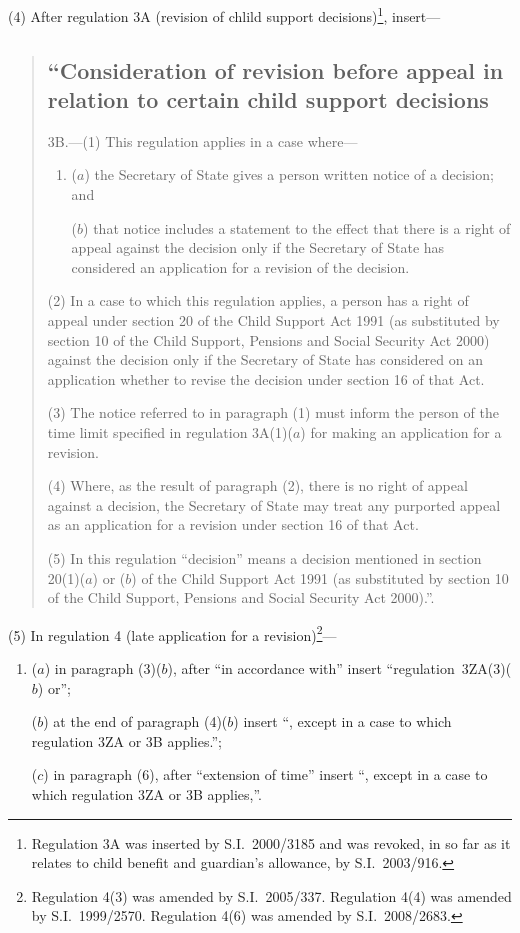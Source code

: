 \documentclass[12pt,a4paper]{article}
\begin{document}
(4) After regulation 3A (revision of chlild support decisions)\footnote{Regulation 3A was inserted by S.I.~2000/3185 and was revoked, in so far as it relates to child benefit and guardian’s allowance, by S.I.~2003/916.}, insert—
\begin{quotation}
\subsection*{“Consideration of revision before appeal in relation to certain child support decisions}

3B.---(1)  This regulation applies in a case where—
\begin{enumerate}\item[]
($a$) the Secretary of State gives a person written notice of a decision; and

($b$) that notice includes a statement to the effect that there is a right of appeal against the decision only if the Secretary of State has considered an application for a revision of the decision.
\end{enumerate}

(2) In a case to which this regulation applies, a person has a right of appeal under section 20 of the Child Support Act 1991 (as substituted by section 10 of the Child Support, Pensions and Social Security Act 2000) against the decision only if the Secretary of State has considered on an application whether to revise the decision under section 16 of that Act.

(3) The notice referred to in paragraph (1) must inform the person of the time limit specified in regulation 3A(1)($a$)  for making an application for a revision.

(4) Where, as the result of paragraph (2), there is no right of appeal against a decision, the Secretary of State may treat any purported appeal as an application for a revision under section 16 of that Act.

(5) In this regulation “decision” means a decision mentioned in section 20(1)($a$)  or ($b$)  of the Child Support Act 1991 (as substituted by section 10 of the Child Support, Pensions and Social Security Act 2000).”.
\end{quotation}

(5) In regulation 4 (late application for a revision)\footnote{Regulation 4(3) was amended by S.I.~2005/337. Regulation 4(4) was amended by S.I.~1999/2570. Regulation 4(6) was amended by S.I.~2008/2683.}—
\begin{enumerate}\item[]
($a$) in paragraph (3)($b$), after “in accordance with” insert “regulation~3ZA(3)($b$)  or”;

($b$) at the end of paragraph (4)($b$)  insert “, except in a case to which regulation 3ZA or 3B applies.”;

($c$) in paragraph (6), after “extension of time” insert “, except in a case to which regulation 3ZA or 3B applies,”.
\end{enumerate}
\end{document}
